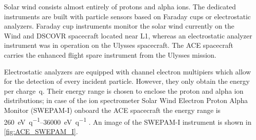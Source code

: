 Solar wind consists almost entirely of protons and alpha ions. The dedicated instruments are built with particle sensors based on Faraday cups or electrostatic analyzers. Faraday cup instruments monitor the solar wind currently on the Wind and DSCOVR spacecraft located near L1, whereas an electrostatic analyzer instrument was in operation on the Ulysses spacecraft. The ACE spacecraft carries the enhanced flight spare instrument from the Ulysses mission.

Electrostatic analyzers are equipped with channel electron multipiers which allow for the detection of every incident particle. However, they only obtain the energy per charge~q. Their energy range is chosen to enclose the proton and alpha ion distributions; in case of the ion spectrometer Solar Wind Electron Proton Alpha Monitor (SWEPAM-I) onboard the ACE spacecraft the energy range is \SIrange{260}{36000}{\electronvolt\per q} \citep{McComas1998a}. An image of the SWEPAM-I instrument is shown in \autoref{fig:ACE_SWEPAM_I}.
\begin{figure}[!b]
	\begin{floatrow}
	\end{floatrow}
\end{figure}

